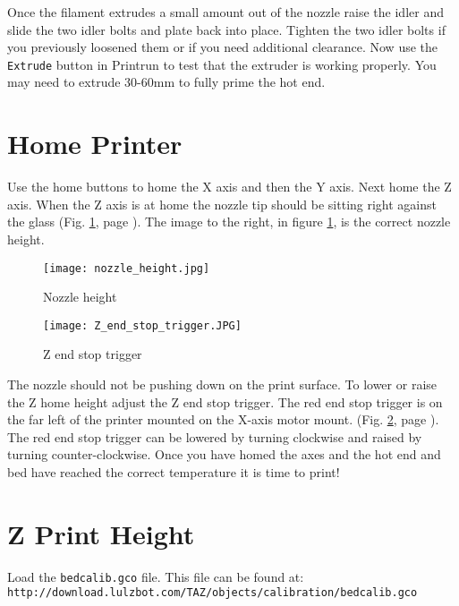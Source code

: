 Once the filament extrudes a small amount out of the nozzle raise the idler and slide the two idler bolts and plate back into place. Tighten the two idler bolts if you previously loosened them or if you need additional clearance. Now use the \texttt{Extrude} button in Printrun to test that the extruder is working properly. You may need to extrude 30-60mm to fully prime the hot end.

\section{Home Printer}
Use the home buttons to home the X axis and then the Y axis. Next home the Z axis. When the Z axis is at home the nozzle tip should be sitting right against the glass
(Fig. \ref{fig:nozzle_height}, page \pageref{fig:nozzle_height}). The image to the right, in figure \ref{fig:nozzle_height}, is the correct nozzle height.
\begin{figure}[p]
\centering
\texttt{[image: nozzle\_height.jpg]}
\caption{Nozzle height}
\label{fig:nozzle_height}
\end{figure}
\begin{figure}[p]
\centering
\texttt{[image: Z\_end\_stop\_trigger.JPG]}
\caption{Z end stop trigger}
\label{fig:Z_end_stop_trigger}
\end{figure}
The nozzle should not be pushing down on the print surface. To lower or raise the Z home height adjust the Z end stop trigger. The red end stop trigger is on the far left of the printer mounted on the X-axis motor mount.
(Fig. \ref{fig:Z_end_stop_trigger}, page \pageref{fig:Z_end_stop_trigger}).
The red end stop trigger can be lowered by turning clockwise and raised by turning counter-clockwise. Once you have homed the axes and the hot end and bed have reached the correct temperature it is time to print!

\section{Z Print Height}
Load the \texttt{bedcalib.gco} file.
This file can be found at:
\texttt{http://download.lulzbot.com/TAZ/objects/calibration/bedcalib.gco}

